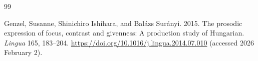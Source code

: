 \documentclass[ruler]{CUP-JNL-LIN}%
\begin{document}
\begin{Backmatter}
\begin{thebibliography}{99}

{Genzel, Susanne, Shinichiro Ishihara, and Balázs Surányi}. 2015. The prosodic expression of focus, contrast and givenness: A production study of Hungarian. \textit{Lingua} 165, 183--204. \url{https://doi.org/10.1016/j.lingua.2014.07.010}  (accessed 2026 February 2).




\end{thebibliography}
\end{Backmatter}
\end{document}
